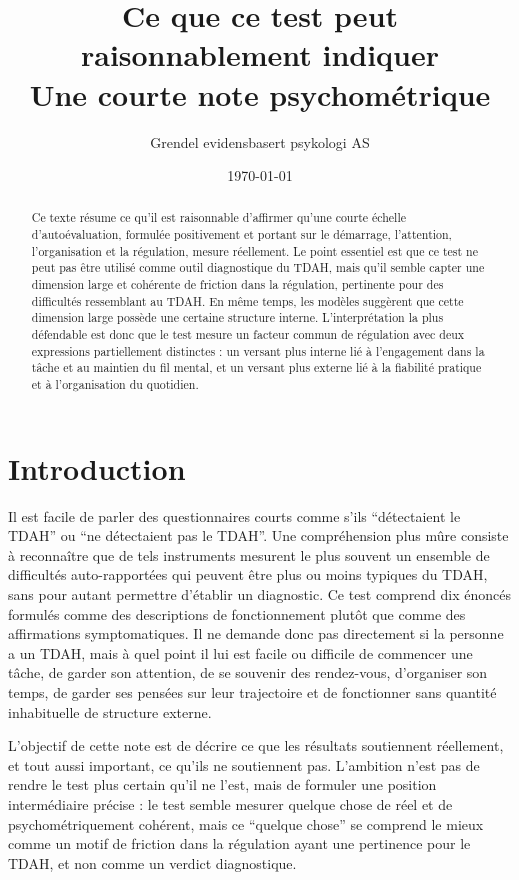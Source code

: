 \documentclass[11pt,a4paper]{article}
\title{Ce que ce test peut raisonnablement indiquer\\
\large Une courte note psychométrique}
\author{Grendel evidensbasert psykologi AS}
\date{\today}
\begin{document}
\maketitle

\begin{abstract}
Ce texte résume ce qu’il est raisonnable d’affirmer qu’une courte échelle d’autoévaluation, formulée positivement et portant sur le démarrage, l’attention, l’organisation et la régulation, mesure réellement. Le point essentiel est que ce test ne peut pas être utilisé comme outil diagnostique du TDAH, mais qu’il semble capter une dimension large et cohérente de friction dans la régulation, pertinente pour des difficultés ressemblant au TDAH. En même temps, les modèles suggèrent que cette dimension large possède une certaine structure interne. L’interprétation la plus défendable est donc que le test mesure un facteur commun de régulation avec deux expressions partiellement distinctes : un versant plus interne lié à l’engagement dans la tâche et au maintien du fil mental, et un versant plus externe lié à la fiabilité pratique et à l’organisation du quotidien.
\end{abstract}

\section{Introduction}
Il est facile de parler des questionnaires courts comme s’ils ``détectaient le TDAH'' ou ``ne détectaient pas le TDAH''. Une compréhension plus mûre consiste à reconnaître que de tels instruments mesurent le plus souvent un ensemble de difficultés auto-rapportées qui peuvent être plus ou moins typiques du TDAH, sans pour autant permettre d’établir un diagnostic. Ce test comprend dix énoncés formulés comme des descriptions de fonctionnement plutôt que comme des affirmations symptomatiques. Il ne demande donc pas directement si la personne a un TDAH, mais à quel point il lui est facile ou difficile de commencer une tâche, de garder son attention, de se souvenir des rendez-vous, d’organiser son temps, de garder ses pensées sur leur trajectoire et de fonctionner sans quantité inhabituelle de structure externe.

L’objectif de cette note est de décrire ce que les résultats soutiennent réellement, et tout aussi important, ce qu’ils ne soutiennent pas. L’ambition n’est pas de rendre le test plus certain qu’il ne l’est, mais de formuler une position intermédiaire précise : le test semble mesurer quelque chose de réel et de psychométriquement cohérent, mais ce ``quelque chose'' se comprend le mieux comme un motif de friction dans la régulation ayant une pertinence pour le TDAH, et non comme un verdict diagnostique.
\end{document}
